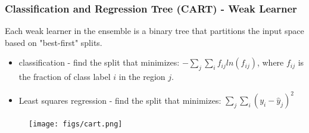 \documentclass[t, pdftex]{beamer}
\begin{document}
\begin{frame}[shrink=10]
\frametitle{Classification and Regression Tree (CART) - Weak Learner}
Each weak learner in the ensemble is a binary tree that partitions the input space based on "best-first" splits.  
\begin{itemize}
\item classification - find the split that minimizes: $-\sum_j\sum_i f_{ij} ln(f_{ij})$, where $f_{ij}$ is the fraction of class label $i$ in the region $j$.
\item Least squares regression - find the split that minimizes: $\sum_j\sum_i(y_i - \hat y_{j})^2$
\end{itemize}

\begin{figure}[!htbp]
\centering
\texttt{[image: figs/cart.png]}
\label{model_overview}
\end{figure}
\end{frame}
\end{document}
